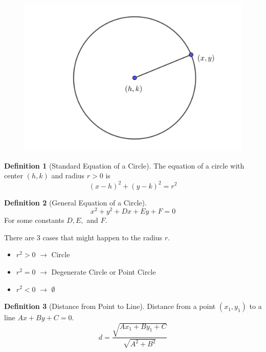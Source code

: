\documentclass[a4paper]{article}
\theoremstyle{definition}
\newtheorem*{defi}{Definition}
\begin{document}
\begin{figure}[h]
     \centering
     \includegraphics[scale = .8]{circle1.png}
\end{figure}

\begin{defi}[Standard Equation of a Circle]
     The equation of a circle with center $(h,k)$ and radius $r>0$ is 
     \begin{equation*}
        (x-h)^2+(y-k)^2 = r^2
     \end{equation*} 
\end{defi}
\begin{defi}[General Equation of a Circle]
     \begin{equation*}
          x^2+y^2+Dx+Ey+F=0
     \end{equation*}
     For some constants $D, E,$ and $F$.
\end{defi}
There are $3$ cases that might happen to the radius $r$.    
\begin{itemize}
     \item $r^2 > 0$ $\rightarrow$ Circle
     \item $r^2 = 0$ $\rightarrow$ Degenerate Circle or Point Circle
     \item $r^2 < 0$ $\rightarrow$ $\emptyset$
\end{itemize}
\begin{defi}[Distance from Point to Line]
     Distance from a point $(x_1,y_1)$ to a line $Ax+By+C=0$.
     \begin{equation*}
          d = \dfrac{\sqrt{Ax_1+By_1+C}}{\sqrt{A^2+B^2}}
     \end{equation*}
\end{defi}
\end{document}
